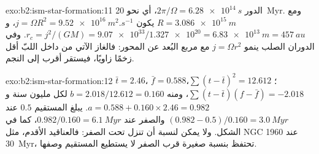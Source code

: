 \begin{solution}{exo:b2:ism-star-formation:11}
الدور $2\pi/\Omega = \qty{6.28e14}{s}$، أي نحو \qty{20}{Myr}. ومع
$R = \qty{3.086e15}{m}$ يكون $j = \Omega R^2 = \qty{9.52e16}{m^2.s^{-1}}$،
و$r_c = j^2/(GM) = \num{9.07e33}/\num{1.327e20} = \qty{6.83e13}{m} = \qty{457}{au}$.
وفي الدوران الصلب ينمو $j = \Omega r^2$ مع مربع البُعد عن المحور:
فالغاز الآتي من داخل اللبّ أقل زخمًا زاويًا، فيستقر أقرب إلى النجم.
\end{solution}

\begin{solution}{exo:b2:ism-star-formation:12}
$\bar t = 2.46$، $\bar f = 0.588$؛ $\sum(t - \bar t)^2 = 12.612$،
$\sum(t - \bar t)(f - \bar f) = -2.018$، ومنه $b = 2.018/12.612 = 0.160$ لكل مليون
سنة و$a = 0.588 + 0.160\times2.46 = 0.982$. يبلغ المستقيم $0.5$ عند
$(0.982 - 0.5)/0.160 = \qty{3.0}{Myr}$ والصفر عند $0.982/0.160 = \qty{6.1}{Myr}$، كما في
الشكل. ولا يمكن لنسبة أن تنزل تحت الصفر: فالعناقيد الأقدم، مثل NGC 1960 عند
\qty{30}{Myr}، تحتفظ بنسبة صغيرة قرب الصفر لا يستطيع المستقيم وصفها.
\end{solution}

